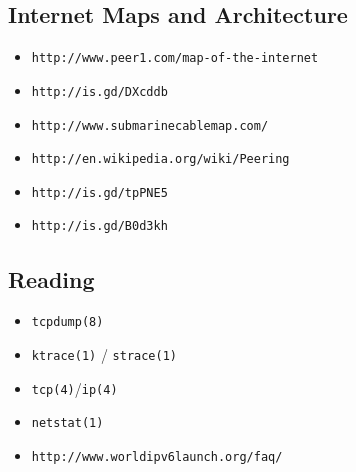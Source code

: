 \documentclass[xga]{xdvislides}
\begin{document}
%

\subsection{Internet Maps and Architecture}
\begin{itemize}
	\item \verb+http://www.peer1.com/map-of-the-internet+
	\item \verb+http://is.gd/DXcddb+
	\item \verb+http://www.submarinecablemap.com/+
	\item \verb+http://en.wikipedia.org/wiki/Peering+
	\item \verb+http://is.gd/tpPNE5+
	\item \verb+http://is.gd/B0d3kh+
\end{itemize}

\subsection{Reading}
\begin{itemize}
	\item \verb+tcpdump(8)+
	\item \verb+ktrace(1)+ / \verb+strace(1)+
	\item \verb+tcp(4)+/\verb+ip(4)+
	\item \verb+netstat(1)+
	\item \verb+http://www.worldipv6launch.org/faq/+
\end{itemize}
\end{document}
